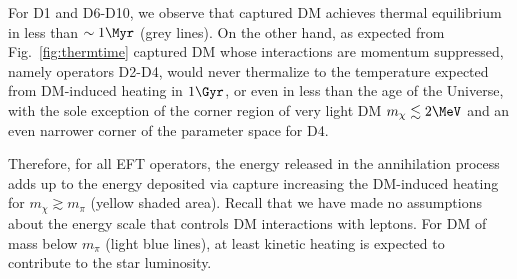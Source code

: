 For D1 and D6-D10, we observe that captured DM achieves thermal equilibrium in less than $\sim 1\Myr$ (grey lines). 
On the other hand, as expected from Fig.~\ref{fig:thermtime} captured DM whose interactions are momentum suppressed, namely operators D2-D4, would never thermalize to the temperature expected from DM-induced heating in $1\Gyr$, or even in less than the age of the 
Universe,
with the sole exception of the corner region of very light DM $m_\chi\lesssim 2\MeV$ and an even narrower corner of the parameter space for D4. 

Therefore, for all EFT operators,  the energy released in the annihilation process adds up to the energy deposited via capture increasing the DM-induced heating  
for $m_\chi\gtrsim m_\pi$ (yellow shaded area). 
Recall that we have made no assumptions about the energy scale that controls DM interactions with leptons. 
For DM of mass below $m_\pi$ (light blue lines), at least kinetic heating is expected to contribute to the star luminosity.  

  